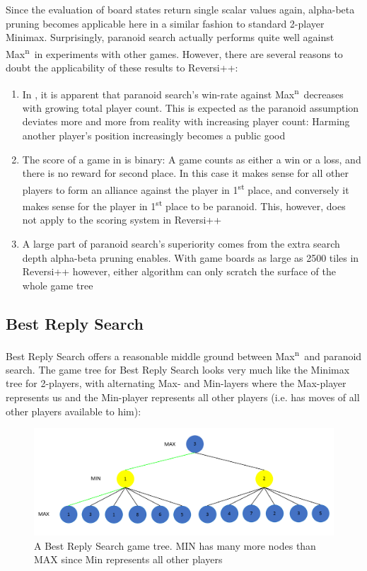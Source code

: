 \documentclass[a4paper,12pt]{article}
\newcommand{\Maxn}{Max\textsuperscript{n}\ }
\begin{document}
    Since the evaluation of board states return single scalar values again, alpha-beta pruning becomes applicable here in a similar fashion to standard 2-player Minimax. Surprisingly, paranoid search actually performs quite well against \Maxn in experiments \cite{algorithm-comparison}\cite{best-reply-search} with other games. However, there are several reasons to doubt the applicability of these results to Reversi++:
    \begin{enumerate}
        \item In \cite{algorithm-comparison}, it is apparent that paranoid search's win-rate against \Maxn decreases with growing total player count. This is expected as the paranoid assumption deviates more and more from reality with increasing player count: Harming another player's position increasingly becomes a public good
        \item The score of a game in \cite{best-reply-search} is binary: A game counts as either a win or a loss, and there is no reward for second place. In this case it makes sense for all other players to form an alliance against the player in 1\textsuperscript{st} place, and conversely it makes sense for the player in 1\textsuperscript{st} place to be paranoid. This, however, does not apply to the scoring system in Reversi++
        \item A large part of paranoid search's superiority comes from the extra search depth alpha-beta pruning enables. With game boards as large as 2500 tiles in Reversi++ however, either algorithm can only scratch the surface of the whole game tree
    \end{enumerate}
    
    \subsection{Best Reply Search}
    Best Reply Search \cite{best-reply-search} offers a reasonable middle ground between \Maxn and paranoid search. The game tree for Best Reply Search looks very much like the Minimax tree for 2-players, with alternating Max- and Min-layers where the Max-player represents us and the Min-player represents all other players (i.e. has moves of all other players available to him):
    
    \begin{figure}[H]
        \centering
        \includegraphics[width=\textwidth,keepaspectratio]{pictures/assignment3/BRSTree.png}
        \caption{A Best Reply Search game tree. MIN has many more nodes than MAX since Min represents all other players}
    \end{figure}
    
\end{document}
